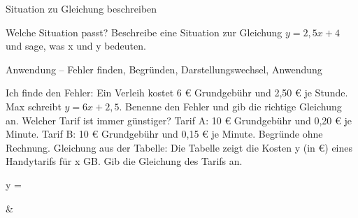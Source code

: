 \begin{aufgabe}{Situation zu Gleichung beschreiben}
\begin{teile}
\teil Welche Situation passt? Beschreibe eine Situation zur Gleichung $y = 2{,}5x + 4$ und sage, was x und y bedeuten.
\end{teile}
\end{aufgabe}

\begin{aufgabe}{Anwendung – Fehler finden, Begründen, Darstellungswechsel, Anwendung}
\begin{teile}
\teil Ich finde den Fehler: Ein Verleih kostet 6 € Grundgebühr und 2{,}50 € je Stunde. Max schreibt $y = 6x + 2{,}5$. Benenne den Fehler und gib die richtige Gleichung an.
\teil Welcher Tarif ist immer günstiger? Tarif A: 10 € Grundgebühr und 0{,}20 € je Minute. Tarif B: 10 € Grundgebühr und 0{,}15 € je Minute. Begründe ohne Rechnung.
\teil Gleichung aus der Tabelle: Die Tabelle zeigt die Kosten y (in €) eines Handytarifs für x GB. Gib die Gleichung des Tarifs an.

y = \leerfeld
\end{teile}
\begin{gleichungsraster}[2]
 & \\
\end{gleichungsraster}
\end{aufgabe}
